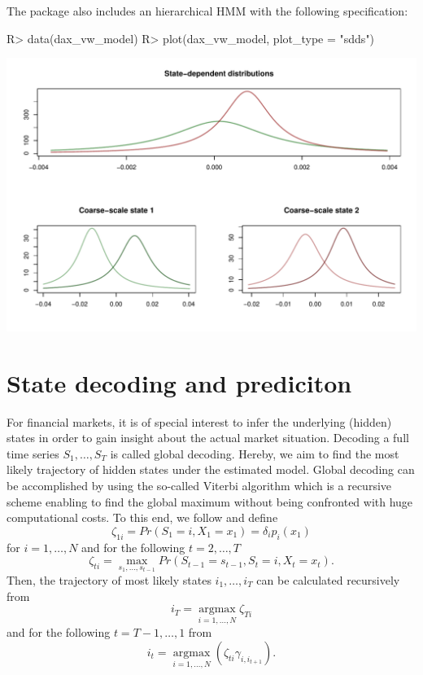 \documentclass[article]{jss}
\begin{document}
The package also includes an hierarchical HMM with the following specification:

%
\begin{Schunk}
\begin{Sinput}
R> data(dax_vw_model)
R> plot(dax_vw_model, plot_type = "sdds")
\end{Sinput}
\end{Schunk}
\includegraphics{fhmm_oelschlaeger_adam_michels-hhmm_model}
%


\section{State decoding and prediciton} \label{sec:state_decoding_and_prediction} %

For financial markets, it is of special interest to infer the underlying (hidden) states in order to gain insight about the actual market situation. Decoding a full time series $S_1, \ldots, S_T$ is called global decoding. Hereby, we aim to find the most likely trajectory of hidden states under the estimated model. 
Global decoding can be accomplished by using the so-called Viterbi algorithm which is a recursive scheme enabling to find the global maximum without being confronted with huge computational costs. To this end, we follow \cite{zuc16} and define
$$\zeta_{1i} = Pr(S_1 = i, X_1 = x_1) = \delta_i p_i(x_1)$$ 
for $i = 1, \ldots, N$ and for the following $t = 2, \ldots, T$
$$\zeta_{ti} = \operatorname*{max}_{s_1, \ldots, s_{t-1}} Pr(S_{t-1} = s_{t-1}, S_t = i, X_t = x_t).$$ 
Then, the trajectory of most likely states $i_1, \ldots, i_T$ can be calculated recursively from
$$i_T = \operatorname*{argmax}_{i = 1, \ldots, N} \zeta_{Ti}$$ and for the following $t = T-1, \ldots, 1$ from
$$i_t = \operatorname*{argmax}_{i = 1, \ldots, N} (\zeta_{ti} \gamma_{i, i_{t+1}}).$$
\end{document}
